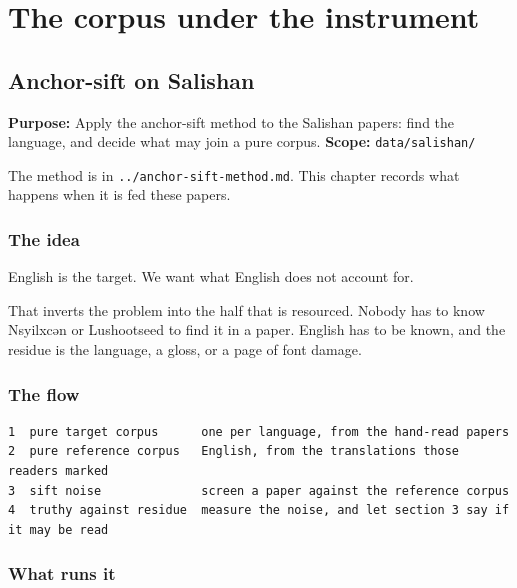 \chapter{The corpus under the instrument}

\section{Anchor-sift on Salishan}

\textbf{Purpose:} Apply the anchor-sift method to the Salishan papers: find the language, and decide what may join a pure corpus. \textbf{Scope:} \texttt{data/\allowbreak{}salishan/\allowbreak{}}

The method is in \texttt{.\allowbreak{}.\allowbreak{}/\allowbreak{}anchor-\allowbreak{}sift-\allowbreak{}method.\allowbreak{}md}. This chapter records what happens when it is fed these papers.

\subsection{The idea}

English is the target. We want what English does not account for.

That inverts the problem into the half that is resourced. Nobody has to know Nsyilxcən or Lushootseed to find it in a paper. English has to be known, and the residue is the language, a gloss, or a page of font damage.

\subsection{The flow}

\begin{lstlisting}[breaklines=true,breakatwhitespace=false,basicstyle=\ttfamily\small]
1  pure target corpus      one per language, from the hand-read papers
2  pure reference corpus   English, from the translations those readers marked
3  sift noise              screen a paper against the reference corpus
4  truthy against residue  measure the noise, and let section 3 say if it may be read
\end{lstlisting}

\subsection{What runs it}

